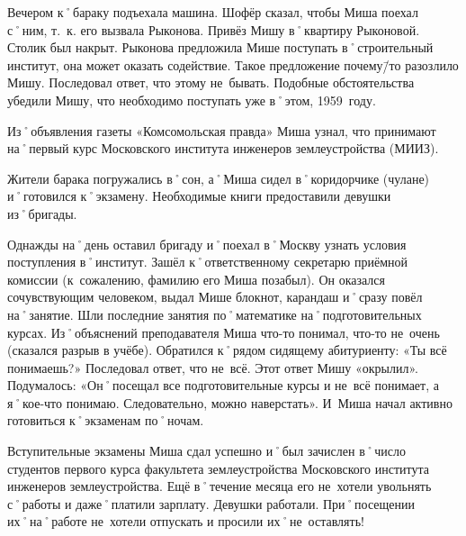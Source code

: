 Вечером к˚бараку подъехала машина. Шофёр сказал, чтобы Миша поехал с˚ним, т.~к. его вызвала Рыконова. Привёз Мишу в˚квартиру Рыконовой. Столик был накрыт. Рыконова предложила Мише поступать в˚строительный институт, она может оказать содействие. Такое предложение почему\=/то разозлило Мишу. Последовал ответ, что этому не~бывать. Подобные обстоятельства убедили Мишу, что необходимо поступать уже в˚этом, 1959~году.

Из˚объявления газеты «Комсомольская правда» Миша узнал, что принимают на˚первый курс Московского института инженеров землеустройства (МИИЗ).

Жители барака погружались в˚сон, а˚Миша сидел в˚коридорчике (чулане) и˚готовился к˚экзамену. Необходимые книги предоставили девушки из˚бригады.

Однажды на˚день оставил бригаду и˚поехал в˚Москву узнать условия поступления в˚институт. Зашёл к˚ответственному секретарю приёмной комиссии (к~сожалению, фамилию его Миша позабыл). Он оказался сочувствующим человеком, выдал Мише блокнот, карандаш и˚сразу повёл на˚занятие. Шли последние занятия по˚математике на˚подготовительных курсах. Из˚объяснений преподавателя Миша что-то понимал, что-то не~очень (сказался разрыв в учёбе). Обратился к˚рядом сидящему абитуриенту: «Ты всё понимаешь?» Последовал ответ, что не~всё. Этот ответ Мишу «окрылил». Подумалось: «Он˚посещал все подготовительные курсы и не~всё понимает, а я˚кое-что понимаю. Следовательно, можно наверстать». И~Миша начал активно готовиться к˚экзаменам по˚ночам.

Вступительные экзамены Миша сдал успешно и˚был зачислен в˚число студентов первого курса факультета землеустройства Московского института инженеров землеустройства. Ещё в˚течение месяца его не~хотели увольнять с˚работы и даже˚платили зарплату. Девушки работали. При˚посещении их˚на˚работе не~хотели отпускать и просили их˚не~оставлять!